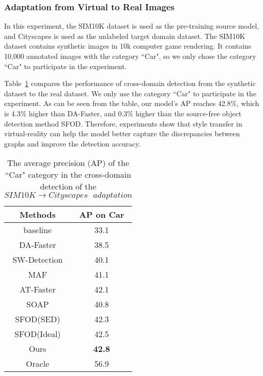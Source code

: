 \documentclass[sn-mathphys]{sn-jnl}%
\theoremstyle{thmstyleone}%
\theoremstyle{thmstyletwo}%
\theoremstyle{thmstylethree}%
\begin{document}
%
%
\subsubsection{Adaptation from Virtual to Real Images} In this experiment, the SIM10K dataset is used as the pre-training source model, and Cityscapes\cite{cordts2016cityscapes} is used as the unlabeled target domain dataset. The SIM10K dataset contains synthetic images in 10k computer game rendering. It contains 10,000 annotated images with the category ``Car", so we only chose the category ``Car" to participate in the experiment.

Table~\ref{table2} compares the performance of cross-domain detection from the synthetic dataset to the real dataset. We only use the category ``Car" to participate in the experiment. As can be seen from the table, our model’s AP reaches 42.8\%, which is 4.3\% higher than DA-Faster, and 0.3\% higher than the source-free object detection method SFOD. Therefore, experiments show that style transfer in virtual-reality can help the model better capture the discrepancies between graphs and improve the detection accuracy.

\begin{table}[]
	\begin{center}{	
			\caption{The average precision (AP) of the ``Car" category in the cross-domain detection of the  $SIM10K\to Cityscapes\text{ }adaptation$}		\label{table2}
			\begin{tabular}{cc}
				
				\hline
				Methods	   &AP on Car       \\ \hline
				baseline	&33.1       \\ \hline
				DA-Faster\cite{chen2018domain}	&38.5       \\
				SW-Detection\cite{saito2019strong}	&40.1       \\
				MAF\cite{he2019multi}		&41.1       \\
				AT-Faster\cite{he2020domain}	&42.1       \\ \hline
				SOAP\cite{xiong2021source}	&40.8       \\
				SFOD(SED)\cite{li2020free}	&42.3       \\
				SFOD(Ideal)\cite{li2020free}	   &42.5       \\
				Ours	&\textbf{42.8}       \\ \hline
				Oracle	&56.9       \\ \hline
				
		\end{tabular}}	
		
	\end{center}
\end{table}
\end{document}
